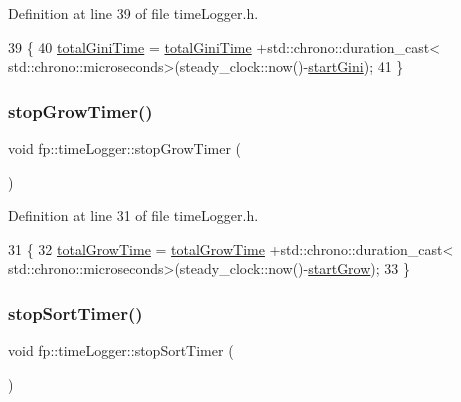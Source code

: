 Definition at line 39 of file time\+Logger.\+h.


\begin{DoxyCode}
39                                            \{
40 \hyperlink{classfp_1_1timeLogger_a1f1c446894052c4df2100b501069a927}{totalGiniTime} = \hyperlink{classfp_1_1timeLogger_a1f1c446894052c4df2100b501069a927}{totalGiniTime} +std::chrono::duration\_cast<
      std::chrono::microseconds>(steady\_clock::now()-\hyperlink{classfp_1_1timeLogger_abe0bd7eeb79ad8c33747afb4f4a99e88}{startGini});
41                 \}
\end{DoxyCode}
\mbox{\label{classfp_1_1timeLogger_a4ce75092aa7c974da223425e921312a6}} 
\subsubsection{\texorpdfstring{stop\+Grow\+Timer()}{stopGrowTimer()}}
{\footnotesize\ttfamily void fp\+::time\+Logger\+::stop\+Grow\+Timer (\begin{DoxyParamCaption}{ }\end{DoxyParamCaption})\hspace{0.3cm}{\ttfamily [inline]}}



Definition at line 31 of file time\+Logger.\+h.


\begin{DoxyCode}
31                                            \{
32 \hyperlink{classfp_1_1timeLogger_ae79b7283b8f150e851fc325c29618ba1}{totalGrowTime} = \hyperlink{classfp_1_1timeLogger_ae79b7283b8f150e851fc325c29618ba1}{totalGrowTime} +std::chrono::duration\_cast<
      std::chrono::microseconds>(steady\_clock::now()-\hyperlink{classfp_1_1timeLogger_a530aa42af210e19fbab96c998271dbc4}{startGrow});
33                 \}
\end{DoxyCode}
\mbox{\label{classfp_1_1timeLogger_a69923048ee4739b4da9581000775fd2a}} 
\subsubsection{\texorpdfstring{stop\+Sort\+Timer()}{stopSortTimer()}}
{\footnotesize\ttfamily void fp\+::time\+Logger\+::stop\+Sort\+Timer (\begin{DoxyParamCaption}{ }\end{DoxyParamCaption})\hspace{0.3cm}{\ttfamily [inline]}}



